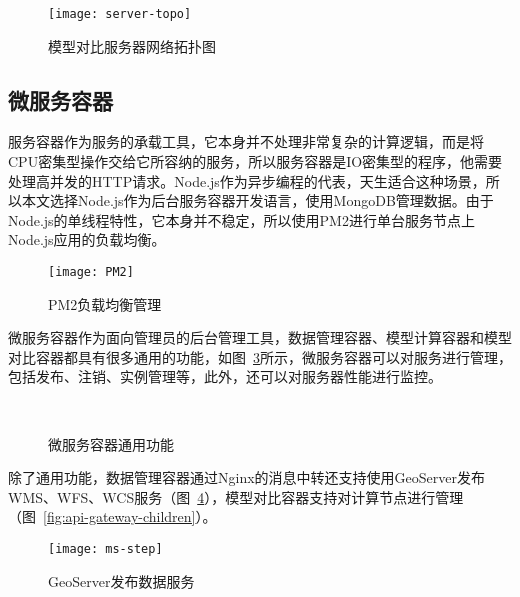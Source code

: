 \begin{figure}[!htbp]
    \centering
    \texttt{[image: server-topo]}
    \caption{模型对比服务器网络拓扑图}
    \label{fig:server-topo}
\end{figure}

\subsection{微服务容器}
服务容器作为服务的承载工具，它本身并不处理非常复杂的计算逻辑，而是将CPU密集型操作交给它所容纳的服务，所以服务容器是IO密集型的程序，他需要处理高并发的HTTP请求。Node.js作为异步编程的代表，天生适合这种场景，所以本文选择Node.js作为后台服务容器开发语言，使用MongoDB管理数据。由于Node.js的单线程特性，它本身并不稳定，所以使用PM2进行单台服务节点上Node.js应用的负载均衡。

\begin{figure}[!htbp]
    \centering
    \texttt{[image: PM2]}
    \caption{PM2负载均衡管理}
    \label{fig:ms-step}
\end{figure}

微服务容器作为面向管理员的后台管理工具，数据管理容器、模型计算容器和模型对比容器都具有很多通用的功能，如图~\ref{fig:service-container-common-fn}所示，微服务容器可以对服务进行管理，包括发布、注销、实例管理等，此外，还可以对服务器性能进行监控。

\begin{figure}[!htbp]
    \centering
    \hfill
     \\
    \hfill
    \caption{微服务容器通用功能}
    \label{fig:service-container-common-fn}
\end{figure}

除了通用功能，数据管理容器通过Nginx的消息中转还支持使用GeoServer发布WMS、WFS、WCS服务（图~\ref{fig:geoserver}），模型对比容器支持对计算节点进行管理（图~\ref{fig:api-gateway-children}）。

\begin{figure}[!htbp]
    \centering
    \texttt{[image: ms-step]}
    \caption{GeoServer发布数据服务}
    \label{fig:geoserver}
\end{figure}

